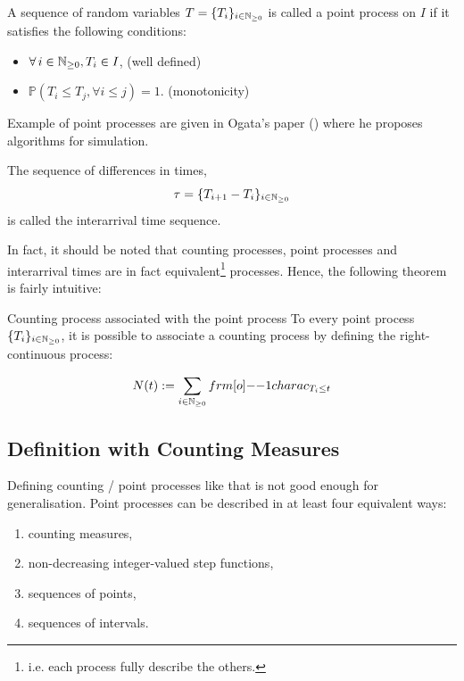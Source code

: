 \documentclass[11pt]{book}
\newcommand{\sequence}[1]{\{ #1 \}_{ i \in \N} }
\begin{document}
\begin{definition}
\label{def:point}
A sequence of random variables $T = \sequence{ T_i } $ is called a point process on $I$ if it satisfies the following conditions:

\begin{itemize}
\item $\forall i \in \N, T_i \in I$, (well defined)
\item $\mathbb P ( T_i \leq T_j, \forall i \leq j) = 1$. (monotonicity)
\end{itemize}
\end{definition}

Example of point processes are given in Ogata's paper (\cite{Ogata}) where he proposes algorithms for simulation.


\begin{remarque}
\label{remarque:inter_arrival_times}
The sequence of differences in times, $$\tau = \sequence{ T_{i+1} - T_i } $$ is called the interarrival time sequence.
\end{remarque}


In fact, it should be noted that counting processes, point processes and interarrival times are in fact equivalent\footnote{i.e. each process fully describe the others.} processes. Hence, the following theorem is fairly intuitive:

\begin{theoreme}{Counting process associated with the point process}
To every point process $\sequence{T_i}$, it is possible to associate a counting process by defining the right-continuous process:

$$ N(t) := \sum_{ i \in \N} \11charac_{ T_i \leq t } $$ 

\end{theoreme}

\subsection{Definition with Counting Measures}
Defining counting / point processes like that is not good enough for generalisation. Point processes can be described in at least four equivalent ways:

\begin{enumerate}
\item counting measures,
\item non-decreasing integer-valued step functions,
\item sequences of points,
\item sequences of intervals.
\end{enumerate}
\end{document}
